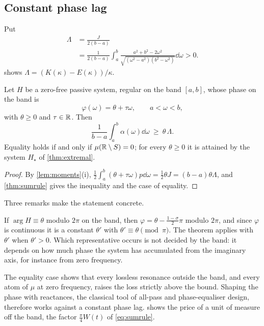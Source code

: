 \subsection{Constant phase lag}

Put
\begin{equation}\label{eq:Lambda}
\begin{aligned}
\Lambda&=\frac{J}{2(b-a)}\\
&=\frac1{2(b-a)}\int_a^b
\frac{a^2+b^2-2\omega^2}{\sqrt{(\omega^2-a^2)(b^2-\omega^2)}}\dd\omega>0 .
\end{aligned}
\end{equation}
 shows $\Lambda=(K(\kappa)-E(\kappa))/\kappa$.

\begin{theorem}\label{thm:main}
Let $H$ be a zero-free passive system, regular on the band $[a,b]$, whose
phase on the band is
\[
\varphi(\omega)=\theta+\tau\omega,\qquad a<\omega<b,
\]
with $\theta\ge0$ and $\tau\in\mathbb R$. Then
\begin{equation}\label{eq:main}
\frac1{b-a}\int_a^b\alpha(\omega)\dd\omega\ \ge\ \theta\,\Lambda .
\end{equation}
Equality holds if and only if $\mu(\mathbb R\setminus S)=0$; for every $\theta\ge0$
it is attained by the system $H_\star$ of \cref{thm:extremal}.
\end{theorem}

\begin{proof}
By \cref{lem:moments}(i),
$\frac12\int_a^b(\theta+\tau\omega)p\dd\omega=\frac12\theta J=(b-a)\theta\Lambda$,
and \cref{thm:sumrule} gives the inequality and the case of equality.
\end{proof}

Three remarks make the statement concrete.

\begin{remark}\label{rem:arg}
If $\arg H\equiv\theta$ modulo $2\pi$ on the band, then
$\varphi=\theta-\frac{1-\sigma}2\pi$ modulo $2\pi$, and since $\varphi$ is
continuous it is a constant $\theta'$ with $\theta'\equiv\theta\pmod\pi$. The
theorem applies with $\theta'$ when $\theta'>0$. Which representative occurs
is not decided by the band: it depends on how much phase the system has
accumulated from the imaginary axis, for instance from zero frequency.
\end{remark}

\begin{remark}\label{rem:resonances}
The equality case shows that every lossless resonance outside the band, and
every atom of $\mu$ at zero frequency, raises the loss strictly above the
bound. Shaping the phase with reactances, the classical tool of all-pass and
phase-equaliser design, therefore works against a constant phase lag.
 shows the price of a unit of measure off the band, the
factor $\frac\pi4W(t)$ of \eqref{eq:sumrule}.
\end{remark}

